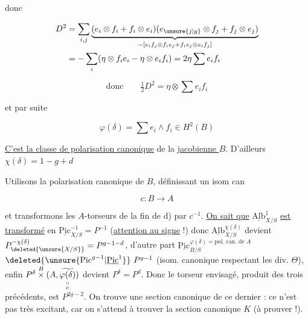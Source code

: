 
donc

\[
\begin{aligned}
D^2&=\sum_{i,j}\underbrace{(e_i\otimes f_i+f_i\otimes e_i)(e_{\unsure{j|g}}\otimes f_j+f_j\otimes e_j)}_{-[e_i f_j\otimes f_i e_j+f_i e_j\otimes e_i f_j]}\\
&=-\sum_i(\eta\otimes f_i e_i-\eta\otimes e_i f_i)=2\eta\sum e_i f_i
\end{aligned}
\]

\[
\text{donc}\qquad\tfrac12D^2=\eta\otimes\sum e_i f_i
\]

et par suite

\[
\varphi(\delta)=\sum e_i\wedge f_i\in H^2(B)
\]

\uline{C'est la classe de polarisation canonique} de la \uline{jacobienne $B$}. D'ailleurs $\chi(\delta)=1-g+d$


 Utilisons la polarisation canonique  de $B$, définissant un isom can

\[
c:B\longrightarrow A
\]

et transformons les $A$-torseurs de la fin de d) par $c^{-1}$. \uline{On sait que} $\underline{\mathrm{Alb}}^1_{X/S}$ \uline{est transformé} en $\underline{\mathrm{Pic}}^{-1}_{X/S}=P^{-1}$ (\uline{attention au signe} !) donc $\underline{\mathrm{Alb}}^{\chi(\delta)}_{X/S}$ devient $P_{\deleted{\unsure{X/S}}}^{-\chi(\delta)}=P^{g-1-d}$, d'autre part $\underline{\mathrm{Pic}}^{\varphi(\delta)=\text{pol. can. de } A}_{B/S}$   $\deleted{\unsure{\mathrm{Pic}^{g-1}|\underline{\mathrm{Pic}}^1}}\ P^{g-1}$ (isom. canonique respectant les div. $\Theta$), enfin $P^\delta\overset B\times(A,\underset{\substack{\shortparallel\\c}}{\widetilde{\varphi(\delta)}})$ devient $P^\delta=P^d$. Donc le torseur envisagé, produit  des trois précédents, est $P^{2g-2}$. On trouve une section canonique de ce dernier : ce n'est pas très excitant, car on s'attend à trouver la section canonique $K$ (à prouver !).
